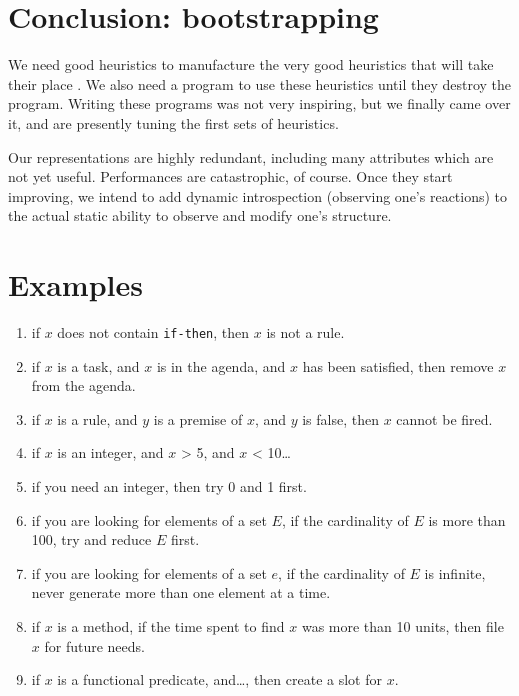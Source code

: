 \documentclass[11pt,a4paper,svgnames]{article}
\begin{document}
  \section{Conclusion: bootstrapping}
  \label{sec:concl-bootstrap}

  We need good heuristics to manufacture the very good heuristics that will take
  their place \cite{Pitrat-Maciste-1985}. We also need a program to use these
  heuristics until they destroy the program. Writing these programs was not very
  inspiring, but we finally came over it, and are presently tuning the first sets
  of heuristics.

  Our representations are highly redundant, including many attributes which are
  not yet useful. Performances are catastrophic, of course. Once they start
  improving, we intend to add dynamic introspection (observing one's reactions)
  to the actual static ability to observe and modify one's structure.

  \section*{Examples}
  \label{sec:examples}

  \begin{enumerate}
  \item if $x$ does not contain \texttt{if-then}, then $x$ is not a rule.
  \item if $x$ is a task, and $x$ is in the agenda, and $x$ has been satisfied,
        then remove $x$ from the agenda.
  \item if $x$ is a rule, and $y$ is a premise of $x$, and $y$ is false, then
        $x$ cannot be fired.
  \item if $x$ is an integer, and $x$ > 5, and $x$ < 10\ldots
  \item if you need an integer, then try 0 and 1 first.
  \item if you are looking for elements of a set $E$, if the cardinality of $E$
        is more than 100, try and reduce $E$ first.
  \item if you are looking for elements of a set $e$, if the cardinality of $E$
        is infinite, never generate more than one element at a time.
  \item if $x$ is a method, if the time spent to find $x$ was more than 10
          units, then file $x$ for future needs.
  \item if $x$ is a functional predicate, and\ldots, then create a slot for $x$.
  \end{enumerate}

\clearpage
{}



\end{document}
